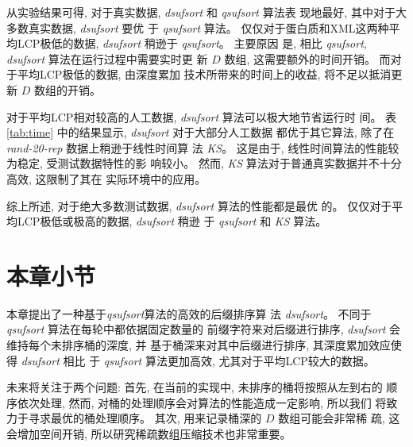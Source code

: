 从实验结果可得, 对于真实数据, \emph{dsufsort} 和 \emph{qsufsort} 算法表
现地最好, 其中对于大多数真实数据, \emph{dsufsort} 要优
于 \emph{qsufsort} 算法。 仅仅对于蛋白质和XML这两种平均LCP极低的数据,
\emph{dsufsort} 稍逊于 \emph{qsufsort}。 主要原因
是, 相比 \emph{qsufsort}, \emph{dsufsort} 算法在运行过程中需要实时更
新 $D$ 数组, 这需要额外的时间开销。 而对于平均LCP极低的数据, 由深度累加
技术所带来的时间上的收益, 将不足以抵消更新 $D$ 数组的开销。

对于平均LCP相对较高的人工数据, \emph{dsufsort} 算法可以极大地节省运行时
间。 表 \ref{tab:time} 中的结果显示, \emph{dsufsort} 对于大部分人工数据
都优于其它算法, 除了在 \emph{rand-20-rep} 数据上稍逊于线性时间算
法 \emph{KS}。 这是由于, 线性时间算法的性能较为稳定, 受测试数据特性的影
响较小。 然而, \emph{KS} 算法对于普通真实数据并不十分高效, 这限制了其在
实际环境中的应用。

综上所述, 对于绝大多数测试数据, \emph{dsufsort} 算法的性能都是最优
的。 仅仅对于平均LCP极低或极高的数据, \emph{dsufsort} 稍逊
于 \emph{qsufsort} 和 \emph{KS} 算法。

\section{本章小节}
\label{sec:3_Conclusion}

本章提出了一种基于\emph{qsufsort}算法的高效的后缀排序算
法 \emph{dsufsort}。 不同于 \emph{qsufsort} 算法在每轮中都依据固定数量的
前缀字符来对后缀进行排序, \emph{dsufsort} 会维持每个未排序桶的深度, 并
基于桶深来对其中后缀进行排序, 其深度累加效应使得 \emph{dsufsort} 相比
于 \emph{qsufsort} 算法更加高效, 尤其对于平均LCP较大的数据。

未来将关注于两个问题: 首先, 在当前的实现中, 未排序的桶将按照从左到右的
顺序依次处理, 然而, 对桶的处理顺序会对算法的性能造成一定影响, 所以我们
将致力于寻求最优的桶处理顺序。 其次, 用来记录桶深的 $D$ 数组可能会非常稀
疏, 这会增加空间开销, 所以研究稀疏数组压缩技术也非常重要。
